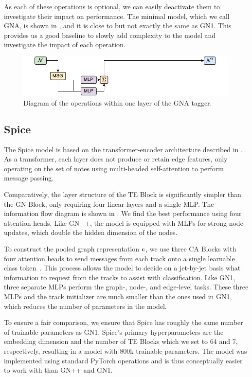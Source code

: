 As each of these operations is optional, we can easily deactivate them to investigate their impact on performance.
The minimal model, which we call GNA, is shown in , and it is close to but not exactly the same as GN1.
This provides us a good baseline to slowly add complexity to the model and investigate the impact of each operation.

\begin{figure}[h!]
    \centering
    \includegraphics[width=0.99\textwidth]{figures/flavour_tagging/gna.pdf}
    \caption{Diagram of the operations within one layer of the GNA tagger.}
    \label{fig:gna_graph}
\end{figure}

\subsection{Spice}

The Spice model is based on the transformer-encoder architecture described in .
As a transformer, each layer does not produce or retain edge features, only operating on the set of notes using multi-headed self-attention to perform message passing.

Comparatively, the layer structure of the TE Block is significantly simpler than the GN Block, only requiring four linear layers and a single MLP\@.
The information flow diagram is shown in .
We find the best performance using four attention heads.
Like GN++, the model is equipped with MLPs for strong node updates, which double the hidden dimension of the nodes.

To construct the pooled graph representation $\mathbf{c}$, we use three CA Blocks with four attention heads to send messages from each track onto a single learnable class token~\cite{GoingDeeper}.
This process allows the model to decide on a jet-by-jet basis what information to request from the tracks to assist with classification.
Like GN1, three separate MLPs perform the graph-, node-, and edge-level tasks.
These three MLPs and the track initializer are much smaller than the ones used in GN1, which reduces the number of parameters in the model.

To ensure a fair comparison, we ensure that Spice has roughly the same number of trainable parameters as GN1.
Spice's primary hyperparameters are the embedding dimension and the number of TE Blocks which we set to 64 and 7, respectively, resulting in a model with 800k trainable parameters.
The model was implemented using standard PyTorch operations and is thus conceptually easier to work with than GN++ and GN1.

